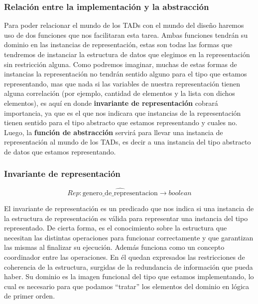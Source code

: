 \subsubsection{Relaci\'on entre la implementaci\'on y la abstracci\'on}

Para poder relacionar el mundo de los TADs con el mundo del dise\~no haremos uso de dos funciones que nos facilitaran esta tarea. Ambas funciones tendr\'an su dominio en las instancias de representaci\'on, estas son todas las formas que tendremos de instanciar la estructura de datos que elegimos en la representaci\'on sin restricci\'on alguna. Como podremos imaginar, muchas de estas formas de instancias la representaci\'on no tendr\'an sentido alguno para el tipo que estamos representando, mas que nada si las variables de nuestra representaci\'on tienen alguna correlaci\'on (por ejemplo, cantidad de elementos y la lista con dichos elementos), es aqu\'i en donde \textbf{invariante de representaci\'on} cobrar\'a importancia, ya que es el que nos indicara que instancias de la representaci\'on tienen sentido para el tipo abstracto que estamos representando y cuales no. Luego, la \textbf{funci\'on de abstracci\'on} servir\'a para llevar una instancia de representaci\'on al mundo de los TADs, es decir a una 
instancia del tipo abstracto de datos que estamos representando.

\subsubsection{Invariante de representaci\'on}

\begin{equation*}
Rep: \widehat{\text{genero\_de\_representacion}} \rightarrow boolean
\end{equation*}

El invariante de representaci\'on es un predicado que nos indica si una instancia de la estructura de representaci\'on es v\'alida para representar una instancia del tipo representado. De cierta forma, es el conocimiento sobre la estructura que necesitan las distintas operaciones para funcionar correctamente y que garantizan las mismas al finalizar su ejecuci\'on. Adem\'as funciona como un concepto coordinador entre las operaciones. En \'el quedan expresados las restricciones de coherencia de la estructura, surgidas de la redundancia de informaci\'on que pueda haber. Su dominio es la imagen funcional del tipo que estamos implementando, lo cual es necesario para que podamos ``tratar'' los elementos del dominio en l\'ogica de primer orden.


